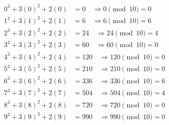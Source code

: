 \documentclass{article}
\begin{document}
\begin{equation*}
\begin{aligned}
    0^3 + 3(0)^2 + 2(0) &= 0 \quad \Rightarrow 0 \pmod{10} = 0 \\
    1^3 + 3(1)^2 + 2(1) &= 6 \quad \Rightarrow 6 \pmod{10} = 6 \\
    2^3 + 3(2)^2 + 2(2) &= 24 \quad \Rightarrow 24 \pmod{10} = 4 \\
    3^3 + 3(3)^2 + 2(3) &= 60 \quad \Rightarrow 60 \pmod{10} = 0 \\
    4^3 + 3(4)^2 + 2(4) &= 120 \quad \Rightarrow 120 \pmod{10} = 0 \\
    5^3 + 3(5)^2 + 2(5) &= 210 \quad \Rightarrow 210 \pmod{10} = 0 \\
    6^3 + 3(6)^2 + 2(6) &= 336 \quad \Rightarrow 336 \pmod{10} = 6 \\
    7^3 + 3(7)^2 + 2(7) &= 504 \quad \Rightarrow 504 \pmod{10} = 4 \\
    8^3 + 3(8)^2 + 2(8) &= 720 \quad \Rightarrow 720 \pmod{10} = 0 \\
    9^3 + 3(9)^2 + 2(9) &= 990 \quad \Rightarrow 990 \pmod{10} = 0
\end{aligned}
\end{equation*}
\end{document}
